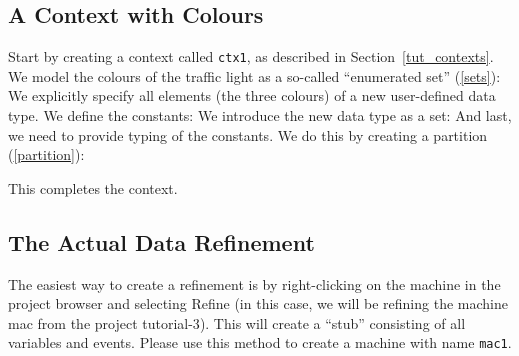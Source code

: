 \subsection{A Context with Colours}
\label{tut_context_with_colors}

Start by creating a context called \texttt{ctx1}, as described in Section~\ref{tut_contexts}.
We model the colours of the traffic light as a so-called ``enumerated set'' (\ref{sets}): 
We explicitly specify all elements (the three colours) of a new user-defined data type.
We define the constants:
We introduce the new data type as a set:
And last, we need to provide typing of the constants.  We do this by creating a partition (\ref{partition}):


This completes the context.

\subsection{The Actual Data Refinement}
\label{tut_actual_data_refinement}

The easiest way to create a refinement is by right-clicking on the machine in the project browser and selecting \textsf{Refine} (in this case, we will be refining the machine \textsf{mac} from the project \textsf{tutorial-3}).  This will create a ``stub'' consisting of all variables and events. Please use this method to create a machine with name \texttt{mac1}.

